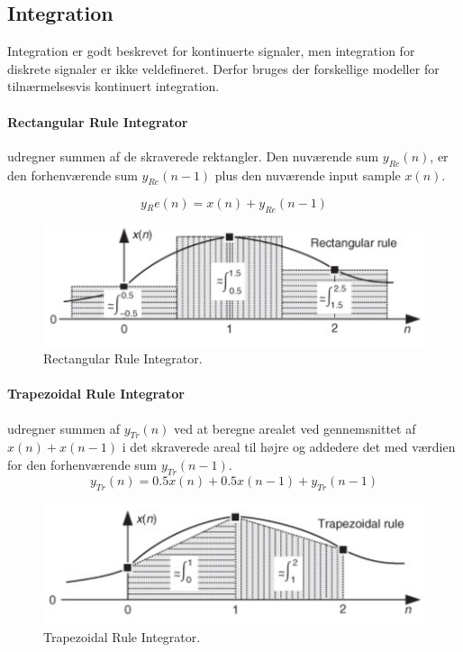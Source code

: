 \documentclass[danish]{article}
\begin{document}
\subsection{Integration}
Integration er godt beskrevet for kontinuerte signaler, men integration for diskrete signaler er ikke veldefineret. Derfor bruges der forskellige modeller for tilnærmelsesvis kontinuert integration.

\paragraph{Rectangular Rule Integrator} udregner summen af de skraverede rektangler. Den nuværende sum $y_{Re}(n)$, er den forhenværende sum $y_{Re}(n-1)$ plus den nuværende input sample $x(n)$.

\begin{equation}
y{_Re}(n) = x(n)+y_{Re}(n-1)
\end{equation}

\begin{figure}[H]
	\centering
	\includegraphics[width=0.6\linewidth]{graphics/rectangular_rule}
	\caption{Rectangular Rule Integrator.}
	\label{fig:rectangular_rule}
\end{figure}


\paragraph{Trapezoidal Rule Integrator} udregner summen af  $y_{Tr}(n)$ ved at beregne arealet ved gennemsnittet af $x(n) + x(n-1)$ i det skraverede areal til højre og addedere det med værdien for den forhenværende sum $y_{Tr}(n-1)$.
\begin{equation}
y_{Tr}(n) = 0.5 x(n)+ 0.5 x(n-1) + y_{Tr}(n-1)
\end{equation}

\begin{figure}[H]
	\centering
	\includegraphics[width=0.6\linewidth]{graphics/trapezoidal_rule}
	\caption{Trapezoidal Rule Integrator.}
	\label{fig:trapezoidal_rule}
\end{figure}
\end{document}
